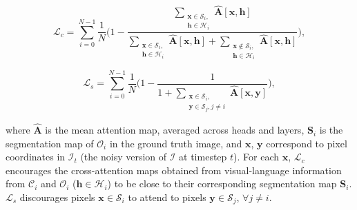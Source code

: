 \begin{equation}
\label{eq:crossattn-loss}
\mathcal{L}_{c} =  \sum\limits_{i = 0}^{N-1}\frac{1}{N}
\bigg(1 - \frac{
\sum\limits_{\substack{\mathbf{x} \in \mathcal{S}_i,\\ \mathbf{h} \in \mathcal{H}_i}}
\hat{\mathbf{A}}\left[ \mathbf{x}, \mathbf{h} \right]
}{
\sum\limits_{\substack{\mathbf{x} \in \mathcal{S}_i, \\ \mathbf{h} \in \mathcal{H}_i}}
\hat{\mathbf{A}}\left[ \mathbf{x}, \mathbf{h} \right]
+
\sum\limits_{\substack{\mathbf{x} \notin \mathcal{S}_i,\\ \mathbf{h} \in \mathcal{H}_i}}
\hat{\mathbf{A}}\left[ \mathbf{x}, \mathbf{h} \right]}\bigg)
,
\end{equation}




\begin{equation}
\label{eq:selfattn-loss}
\mathcal{L}_{s} =  \sum\limits_{i=0}^{N-1}\frac{1}{N}
\bigg(1 - \frac{
1}{1+\sum\limits_{\substack{\mathbf{x} \in \mathcal{S}_i, \\ \mathbf{y} \in \mathcal{S}_j, j \neq i}}
\hat{\mathbf{A}}\left[ \mathbf{x}, \mathbf{y} \right]
}\bigg)
,
\end{equation}

where $\hat{\mathbf{A}}$ is the mean attention map, averaged across heads and layers, $\mathbf{S}_i$ is the segmentation map of $\mathcal{O}_{i}$ in the ground truth image, and $\mathbf{x}$, $\mathbf{y}$ correspond to pixel coordinates in $\mathcal{I}_{t}$ (the noisy version of $\mathcal{I}$ at timestep $t$). For each  $\mathbf{x}$, $\mathcal{L}_{c}$ encourages the cross-attention maps obtained from visual-language information from $\mathcal{C}_i$ and $\mathcal{O}_i$ ($\mathbf{h} \in \mathcal{H}_i$) to be close to their corresponding segmentation map $\mathbf{S}_i$. $\mathcal{L}_{s}$ discourages pixels $\mathbf{x} \in \mathcal{S}_{i}$ to attend to pixels  $\mathbf{y} \in \mathcal{S}_{j}$, $\forall j \neq i$.





